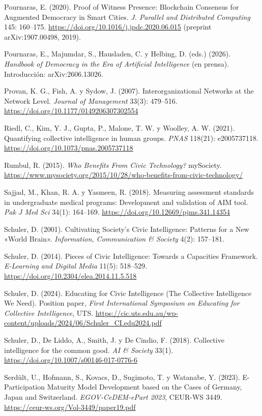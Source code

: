 \documentclass[11pt,a4paper]{article}
\begin{document}
Pournaras, E. (2020). Proof of Witness Presence: Blockchain Consensus for Augmented Democracy in Smart Cities. \emph{J. Parallel and Distributed Computing} 145: 160--175. \url{https://doi.org/10.1016/j.jpdc.2020.06.015} (preprint arXiv:1907.00498, 2019).

Pournaras, E., Majumdar, S., Hausladen, C. y Helbing, D. (eds.) (2026). \emph{Handbook of Democracy in the Era of Artificial Intelligence} (en prensa). Introducción: arXiv:2606.13026.

Provan, K. G., Fish, A. y Sydow, J. (2007). Interorganizational Networks at the Network Level. \emph{Journal of Management} 33(3): 479--516. \url{https://doi.org/10.1177/0149206307302554}

Riedl, C., Kim, Y. J., Gupta, P., Malone, T. W. y Woolley, A. W. (2021). Quantifying collective intelligence in human groups. \emph{PNAS} 118(21): e2005737118. \url{https://doi.org/10.1073/pnas.2005737118}

Rumbul, R. (2015). \emph{Who Benefits From Civic Technology?} mySociety. \url{https://www.mysociety.org/2015/10/28/who-benefits-from-civic-technology/}

Sajjad, M., Khan, R. A. y Yasmeen, R. (2018). Measuring assessment standards in undergraduate medical programs: Development and validation of AIM tool. \emph{Pak J Med Sci} 34(1): 164--169. \url{https://doi.org/10.12669/pjms.341.14354}

Schuler, D. (2001). Cultivating Society's Civic Intelligence: Patterns for a New «World Brain». \emph{Information, Communication \& Society} 4(2): 157--181.

Schuler, D. (2014). Pieces of Civic Intelligence: Towards a Capacities Framework. \emph{E-Learning and Digital Media} 11(5): 518--529. \url{https://doi.org/10.2304/elea.2014.11.5.518}

Schuler, D. (2024). Educating for Civic Intelligence (The Collective Intelligence We Need). Position paper, \emph{First International Symposium on Educating for Collective Intelligence}, UTS. \url{https://cic.uts.edu.au/wp-content/uploads/2024/06/Schuler_CI.edu2024.pdf}

Schuler, D., De Liddo, A., Smith, J. y De Cindio, F. (2018). Collective intelligence for the common good. \emph{AI \& Society} 33(1). \url{https://doi.org/10.1007/s00146-017-0776-6}

Serdült, U., Hofmann, S., Kovacs, D., Sugimoto, T. y Watanabe, Y. (2023). E-Participation Maturity Model Development based on the Cases of Germany, Japan and Switzerland. \emph{EGOV-CeDEM-ePart 2023}, CEUR-WS 3449. \url{https://ceur-ws.org/Vol-3449/paper19.pdf}
\end{document}
